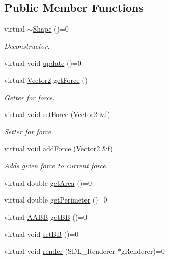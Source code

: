 \subsection*{Public Member Functions}
\begin{DoxyCompactItemize}
\item 
virtual \mbox{\hyperlink{class_shape_a39fe45638d872f0ce9670d7f85290161}{$\sim$\+Shape}} ()=0
\begin{DoxyCompactList}\small\item\em Deconstructor. \end{DoxyCompactList}\item 
virtual void \mbox{\hyperlink{class_shape_a303c47b13b9339dc021e040bbba72651}{update}} ()=0
\item 
virtual \mbox{\hyperlink{struct_vector2}{Vector2}} \mbox{\hyperlink{class_shape_a01d3424af378ac4e8c423c57ccf836d1}{get\+Force}} ()
\begin{DoxyCompactList}\small\item\em Getter for force. \end{DoxyCompactList}\item 
virtual void \mbox{\hyperlink{class_shape_a76d8009348239dbf7426ae54f19844d2}{set\+Force}} (\mbox{\hyperlink{struct_vector2}{Vector2}} \&f)
\begin{DoxyCompactList}\small\item\em Setter for force. \end{DoxyCompactList}\item 
virtual void \mbox{\hyperlink{class_shape_a2fcffede033450a219278164b864e8a3}{add\+Force}} (\mbox{\hyperlink{struct_vector2}{Vector2}} \&f)
\begin{DoxyCompactList}\small\item\em Adds given force to current force. \end{DoxyCompactList}\item 
virtual double \mbox{\hyperlink{class_shape_acec2178598665e96b85f1ac6a13a47b9}{get\+Area}} ()=0
\item 
virtual double \mbox{\hyperlink{class_shape_a3918812ff3a143dabbeba2f650fb5e7c}{get\+Perimeter}} ()=0
\item 
virtual \mbox{\hyperlink{class_a_a_b_b}{A\+A\+BB}} \mbox{\hyperlink{class_shape_a2490226328b30c113a7f07e2edda5f94}{get\+BB}} ()=0
\item 
virtual void \mbox{\hyperlink{class_shape_a540779eb247ef00e4fb262f1f81e90d4}{set\+BB}} ()=0
\item 
virtual void \mbox{\hyperlink{class_shape_a07881321ba401e7cdbd83b4f2b009e37}{render}} (S\+D\+L\+\_\+\+Renderer $\ast$g\+Renderer)=0
\end{DoxyCompactItemize}
